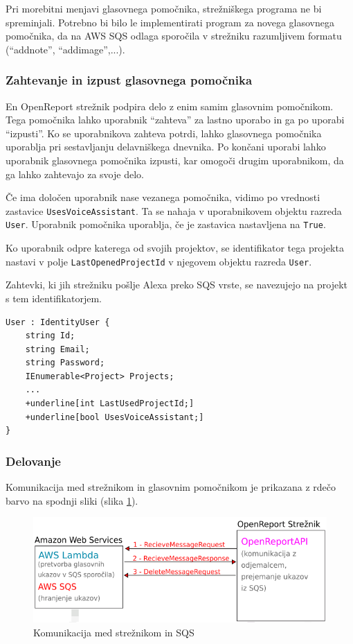 \documentclass[a4paper, 12pt]{book}
\begin{document}
Pri morebitni menjavi glasovnega pomočnika, strežniškega programa ne bi spreminjali.
Potrebno bi bilo le implementirati program za novega glasovnega pomočnika, da na AWS SQS odlaga sporočila v strežniku razumljivem formatu (\enquote{addnote}, \enquote{addimage},...).

\subsubsection{Zahtevanje in izpust glasovnega pomočnika}

En OpenReport strežnik podpira delo z enim samim glasovnim pomočnikom.
Tega pomočnika lahko uporabnik \enquote{zahteva} za lastno uporabo in ga po uporabi \enquote{izpusti}.
Ko se uporabnikova zahteva potrdi, lahko glasovnega pomočnika uporablja pri sestavljanju delavniškega dnevnika.
Po končani uporabi lahko uporabnik glasovnega pomočnika izpusti, kar omogoči drugim uporabnikom, da ga lahko zahtevajo za svoje delo.

Če ima določen uporabnik nase vezanega pomočnika, vidimo po vrednosti zastavice \texttt{UsesVoiceAssistant}.
Ta se nahaja v uporabnikovem objektu razreda \texttt{User}.
Uporabnik pomočnika uporablja, če je zastavica nastavljena na \texttt{True}.

Ko uporabnik odpre katerega od svojih projektov, se identifikator tega projekta nastavi v polje \texttt{LastOpenedProjectId} v njegovem objektu razreda \texttt{User}.

Zahtevki, ki jih strežniku pošlje Alexa preko SQS vrste, se navezujejo na projekt s tem identifikatorjem.

\begin{Verbatim}[commandchars=+\[\]]
User : IdentityUser {
    string Id; 
    string Email;
    string Password; 
    IEnumerable<Project> Projects;
    ... 
    +underline[int LastUsedProjectId;]
    +underline[bool UsesVoiceAssistant;]
}
\end{Verbatim}

\subsubsection{Delovanje}

Komunikacija med strežnikom in glasovnim pomočnikom je prikazana z rdečo barvo na spodnji sliki (slika \ref{plan_sqs_server}).

\begin{figure}[H]
\begin{center}
\includegraphics[width=13cm]{plan_sqs_server}
\end{center}
\caption{Komunikacija med strežnikom in SQS}
\label{plan_sqs_server}
\end{figure}
\end{document}
